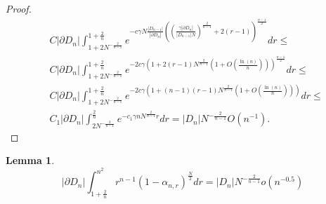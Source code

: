 \documentclass[10pt, twoside, leqno]{article}
\newtheorem{lemma}[thm]{Lemma}
\theoremstyle{definition}
\numberwithin{equation}{section}
\newcommand{\NN}{N^{-\frac 2{n-1} }}
\begin{document}
\begin{proof}
\begin{equation}
\begin{aligned} & C|\partial D_{n}|\int_{1+2\NN}^{1+\frac{2}{n}}e^{-c\gamma N\frac{|D_{n-1}|}{|\partial D_{n}|}\left(\left(\frac{\gamma|\partial D_{n}|}{|D_{n-1}|N}\right)^{\frac{2}{n-1}}+2\left(r-1\right)\right)^{\frac{n-1}{2}}}dr\leq\\
& C|\partial D_{n}|\int_{1+2\NN}^{1+\frac{2}{n}}e^{-2c\gamma\left(1+2\left(r-1\right)N^{\frac{2}{n-1}}\left(1+O\left(\frac{\ln\left(n\right)}{n}\right)\right)\right)^{\frac{n-1}{2}}}dr\leq\\
& C|\partial D_{n}|\int_{1+2\NN}^{1+\frac{2}{n}}e^{-2c\gamma\left(1+\left(n-1\right)\left(r-1\right)N^{\frac{2}{n-1}}\left(1+O\left(\frac{\ln\left(n\right)}{n}\right)\right)\right)}dr\leq\\
& C_{1}|\partial D_{n}|\int_{2\NN}^{\frac{2}{n}}e^{-c_{1}\gamma nN^{\frac{2}{n-1}}r}dr=|D_{n}|N^{-\frac{2}{n-1}}O\left(n^{-1}\right).
\end{aligned}
\end{equation}
\end{proof}
\begin{lemma}
\[
|\partial D_{n}|\int_{1+\frac{2}{n}}^{n^{2}}r^{n-1}\left(1-\alpha_{n,r}\right)^{\frac{N}{2}}dr = |D_{n}|N^{-\frac{2}{n-1}}o\left(n^{-0.5}\right)
\]
\end{lemma}
\end{document}
